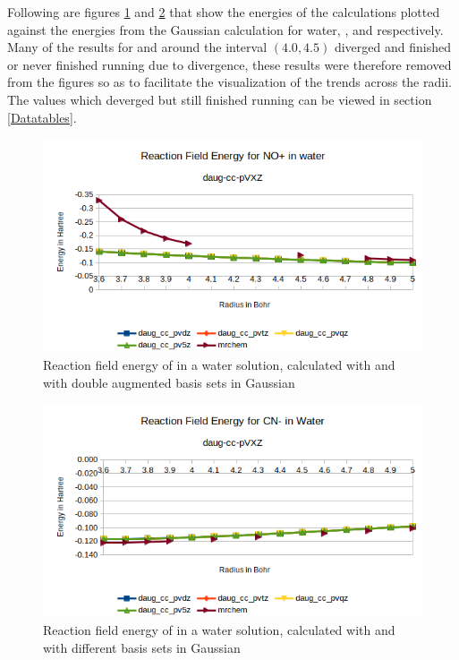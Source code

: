 \documentclass[../master_thesis.tex]{subfiles}
\begin{document}
Following are figures \ref{fig:nopEnergyplotsdaug} and \ref{fig:cyanEnergyplotsdaug}
that show the energies of the \mrchem calculations plotted
against the energies from the Gaussian calculation for water, , and
 respectively. Many of the \mrchem results for  and 
around the interval $(4.0, 4.5)$ diverged and finished or never finished
running due to divergence,  these results were therefore removed from the figures so as to facilitate
the visualization of the trends across the radii. The values which deverged but still
finished running can be viewed in section \ref{Datatables}.



\begin{figure}[h!]
  \centering
    \includegraphics[width=\linewidth]{img/Erdaugnop.png}
  \caption[Energy plots for ]{Reaction field energy of  in a water solution, calculated with \mrchem
  and with double augmented basis sets in Gaussian}
  \label{fig:nopEnergyplotsdaug}
\end{figure}

\begin{figure}[h!]
  \centering
    \includegraphics[width=\linewidth]{img/Erdaugcyan.png}
  \caption{Reaction field energy of  in a water solution, calculated with \mrchem
  and with different basis sets in Gaussian}
  \label{fig:cyanEnergyplotsdaug}
\end{figure}
\end{document}
